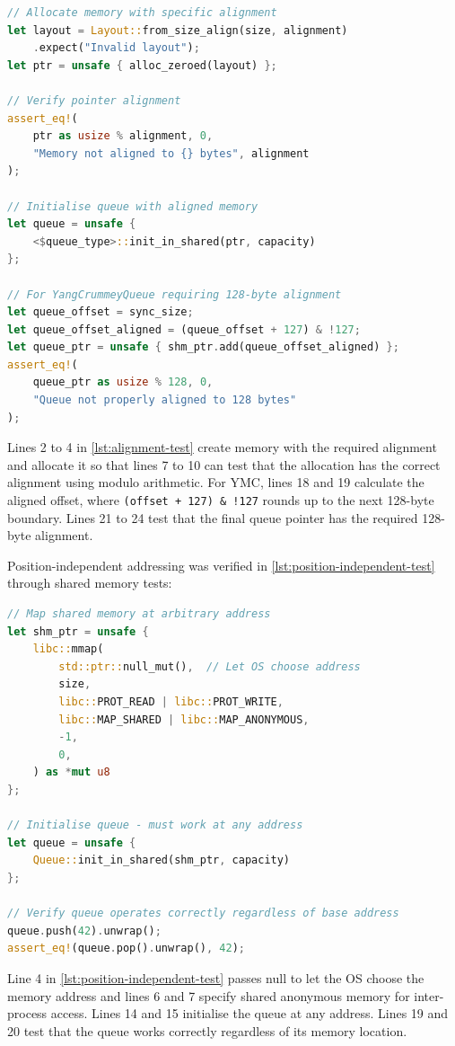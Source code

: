 \begin{lstlisting}[language=Rust, style=boxed, caption={Memory alignment verification test}, label={lst:alignment-test}]
// Allocate memory with specific alignment
let layout = Layout::from_size_align(size, alignment)
    .expect("Invalid layout");
let ptr = unsafe { alloc_zeroed(layout) };

// Verify pointer alignment
assert_eq!(
    ptr as usize % alignment, 0,
    "Memory not aligned to {} bytes", alignment
);

// Initialise queue with aligned memory
let queue = unsafe { 
    <$queue_type>::init_in_shared(ptr, capacity) 
};

// For YangCrummeyQueue requiring 128-byte alignment
let queue_offset = sync_size;
let queue_offset_aligned = (queue_offset + 127) & !127;
let queue_ptr = unsafe { shm_ptr.add(queue_offset_aligned) };
assert_eq!(
    queue_ptr as usize % 128, 0,
    "Queue not properly aligned to 128 bytes"
);
\end{lstlisting}

Lines 2 to 4 in \cref{lst:alignment-test} create memory with the required alignment and allocate it so that lines 7 to 10 can test that the allocation has the correct alignment using modulo arithmetic. For \ac{YMC}, lines 18 and 19 calculate the aligned offset, where \texttt{(offset + 127) \& !127} rounds up to the next 128-byte boundary. Lines 21 to 24 test that the final queue pointer has the required 128-byte alignment.

Position-independent addressing was verified in \cref{lst:position-independent-test} through shared memory tests:

\begin{lstlisting}[language=Rust, style=boxed, caption={Position-independent addressing test}, label={lst:position-independent-test}]
// Map shared memory at arbitrary address
let shm_ptr = unsafe { 
    libc::mmap(
        std::ptr::null_mut(),  // Let OS choose address
        size,
        libc::PROT_READ | libc::PROT_WRITE,
        libc::MAP_SHARED | libc::MAP_ANONYMOUS,
        -1,
        0,
    ) as *mut u8
};

// Initialise queue - must work at any address
let queue = unsafe { 
    Queue::init_in_shared(shm_ptr, capacity) 
};

// Verify queue operates correctly regardless of base address
queue.push(42).unwrap();
assert_eq!(queue.pop().unwrap(), 42);
\end{lstlisting}

Line 4 in \cref{lst:position-independent-test} passes null to let the OS choose the memory address and lines 6 and 7 specify shared anonymous memory for inter-process access. Lines 14 and 15 initialise the queue at any address. Lines 19 and 20 test that the queue works correctly regardless of its memory location.

